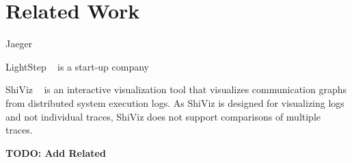 \section{Related Work}

Jaeger ~\cite{Jaeger}

LightStep ~\cite{LightStep} is a start-up company

ShiViz ~\cite{ShiViz} is an interactive visualization tool
that visualizes communication graphs from distributed system execution
logs. As ShiViz is designed for visualizing logs and not individual traces,
ShiViz does not support comparisons of multiple traces.

\textbf{TODO: Add Related}